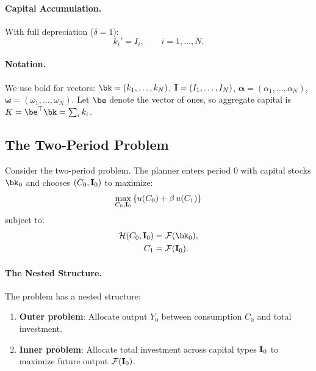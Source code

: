 \paragraph{Capital Accumulation.}
With full depreciation ($\delta = 1$):
\begin{equation}
k_i' = I_i, \qquad i = 1, \ldots, N.
\label{eq:ac-het-accum}
\end{equation}

\paragraph{Notation.}
We use bold for vectors: $\bk = (k_1, \ldots, k_N)$, $\mathbf{I} = (I_1, \ldots, I_N)$, $\boldsymbol{\alpha} = (\alpha_1, \ldots, \alpha_N)$, $\boldsymbol{\omega} = (\omega_1, \ldots, \omega_N)$. Let $\be$ denote the vector of ones, so aggregate capital is $K = \be^\top \bk = \sum_i k_i$.

\subsection{The Two-Period Problem}
\label{subsec:ac-het-two-period}

Consider the two-period problem. The planner enters period 0 with capital stocks $\bk_0$ and chooses $(C_0, \mathbf{I}_0)$ to maximize:
\begin{equation}
\max_{C_0, \mathbf{I}_0} \left\{ u(C_0) + \beta \, u(C_1) \right\}
\label{eq:ac-het-objective}
\end{equation}
subject to:
\begin{align}
\Hfun(C_0, \bI_0) &= \F(\bk_0), \label{eq:ac-het-constraint0} \\
C_1 &= \F(\bI_0). \label{eq:ac-het-constraint1}
\end{align}

\paragraph{The Nested Structure.}
The problem has a nested structure:
\begin{enumerate}[nosep]
\item \textbf{Outer problem}: Allocate output $Y_0$ between consumption $C_0$ and total investment.
\item \textbf{Inner problem}: Allocate total investment across capital types $\mathbf{I}_0$ to maximize future output $\mathcal{F}(\mathbf{I}_0)$.
\end{enumerate}

